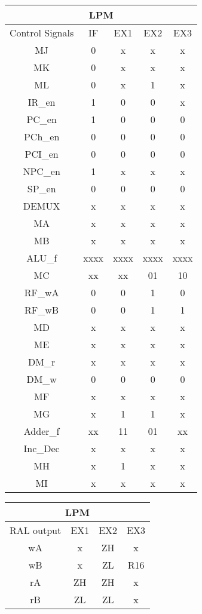 \documentclass[12pt,letterpaper]{article}
\begin{document}
\begin{enumerate}
		\begin{tabular}{ |c|c|c|c|c| } 
			\hline
			\multicolumn{5}{|c|}{LPM}\\ \hline
			Control Signals & IF & EX1 & EX2 & EX3\\ \hline
			MJ & 0  & x & x &  x \\ \hline
			MK & 0 &  x & x &  x\\ \hline
			ML & 0 &  x & 1 &  x \\ \hline
			IR\_en& 1 & 0 & 0  &  x \\ \hline
			PC\_en & 1 & 0 & 0 &  0 \\ \hline
			PCh\_en & 0 & 0 & 0  & 0 \\ \hline
			PCI\_en  & 0 & 0 & 0 & 0 \\ \hline
			NPC\_en  & 1 & x & x &  x \\ \hline
			SP\_en  & 0 & 0 & 0 &  0 \\ \hline
			DEMUX  & x &  x & x & x \\ \hline
			MA  & x & x & x &  x \\ \hline
			MB  & x & x  & x &  x \\ \hline
			ALU\_f  & xxxx & xxxx & xxxx &  xxxx \\ \hline
			MC  & xx &  xx & 01 &  10 \\ \hline
			RF\_wA  & 0 & 0 & 1 &  0 \\ \hline
			RF\_wB  & 0 &  0 & 1 &  1 \\ \hline
			MD  & x & x & x &  x \\ \hline
			ME  & x & x & x & x \\ \hline
			DM\_r  & x & x & x & x \\ \hline
			DM\_w  & 0 & 0 & 0 &  0 \\ \hline
			MF  & x & x & x &  x \\ \hline
			MG  & x & 1 & 1 &  x \\ \hline
			Adder\_f  & xx & 11  & 01 &  xx \\ \hline
			Inc\_Dec  & x & x & x &   x\\ \hline
			MH  & x & 1 & x &  x \\ \hline
			MI  & x & x & x &   x\\ \hline
		\end{tabular}
		\quad
		\quad
		\begin{tabular}{ |c|c|c|c|} 
			\hline
			\multicolumn{4}{|c|}{LPM}\\ \hline
			RAL output & EX1 & EX2 & EX3\\ \hline
			wA & x &  ZH &  x \\ \hline
			wB & x  & ZL &  R16 \\ \hline
			rA & ZH  & ZH & x \\ \hline
			rB & ZL   & ZL &  x\\ \hline
		\end{tabular}	
		





		
	\end{enumerate}
\end{document}
